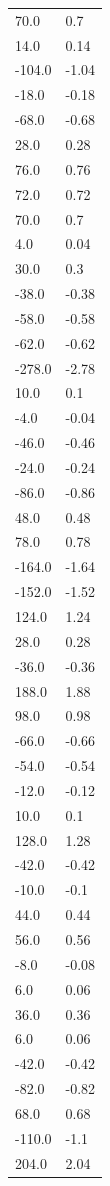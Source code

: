 \begin{longtable}{ll}
70.0 & 0.7 \\
14.0 & 0.14 \\
-104.0 & -1.04 \\
-18.0 & -0.18 \\
-68.0 & -0.68 \\
28.0 & 0.28 \\
76.0 & 0.76 \\
72.0 & 0.72 \\
70.0 & 0.7 \\
4.0 & 0.04 \\
30.0 & 0.3 \\
-38.0 & -0.38 \\
-58.0 & -0.58 \\
-62.0 & -0.62 \\
-278.0 & -2.78 \\
10.0 & 0.1 \\
-4.0 & -0.04 \\
-46.0 & -0.46 \\
-24.0 & -0.24 \\
-86.0 & -0.86 \\
48.0 & 0.48 \\
78.0 & 0.78 \\
-164.0 & -1.64 \\
-152.0 & -1.52 \\
124.0 & 1.24 \\
28.0 & 0.28 \\
-36.0 & -0.36 \\
188.0 & 1.88 \\
98.0 & 0.98 \\
-66.0 & -0.66 \\
-54.0 & -0.54 \\
-12.0 & -0.12 \\
10.0 & 0.1 \\
128.0 & 1.28 \\
-42.0 & -0.42 \\
-10.0 & -0.1 \\
44.0 & 0.44 \\
56.0 & 0.56 \\
-8.0 & -0.08 \\
6.0 & 0.06 \\
36.0 & 0.36 \\
6.0 & 0.06 \\
-42.0 & -0.42 \\
-82.0 & -0.82 \\
68.0 & 0.68 \\
-110.0 & -1.1 \\
204.0 & 2.04 \\

\end{longtable}
